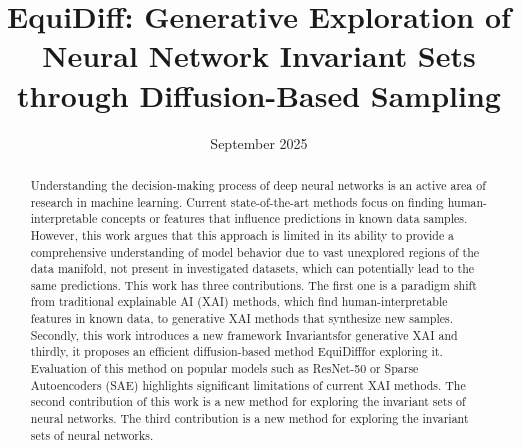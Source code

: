\documentclass[licencjacka,en]{pracamgr}
\title{EquiDiff: Generative Exploration of Neural Network Invariant Sets through Diffusion-Based Sampling}
\date{September 2025}
\newcommand{\method}{EquiDiff}  %
\newcommand{\framework}{Invariants}  %
\begin{document}
\maketitle

\begin{abstract}
Understanding the decision-making process of deep neural networks is an active area of research in machine learning. Current state-of-the-art methods focus on finding human-interpretable concepts or features that influence predictions in known data samples. However, this work argues that this approach is limited in its ability to provide a comprehensive understanding of model behavior due to vast unexplored regions of the data manifold, not present in investigated datasets, which can potentially lead to the same predictions. This work has three contributions. The first one is a paradigm shift from traditional explainable AI (XAI) methods, which find human-interpretable features in known data, to generative XAI methods that synthesize new samples. Secondly, this work introduces a new framework \framework for generative XAI and thirdly, it proposes an efficient diffusion-based method \method for exploring it. Evaluation of this method on popular models such as ResNet-50 or Sparse Autoencoders (SAE) highlights significant limitations of current XAI methods. The second contribution of this work is a new method for exploring the invariant sets of neural networks. The third contribution is a new method for exploring the invariant sets of neural networks.
\end{abstract}

\tableofcontents














\end{document}
